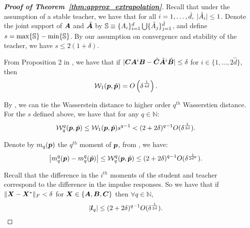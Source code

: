 \begin{proof}[\textbf{Proof of Theorem~\ref{thm:approx_extrapolation}}]
Recall that under the assumption of a stable teacher, we have that for all $i=1,\dots,\hat{d},\; |\hat{{A}}_i|\le 1$. Denote the joint support of ${\bm{A}}$ and $\hat{{\bm{A}}}$ by ${\mathbb{S}}\equiv \{{A}_i\}_{i=1}^{d}\bigcup \{\hat{{A}}_j\}_{j=1}^{\hat{d}}$, and define $s=\max \{{\mathbb{S}}\} - \min \{{\mathbb{S}}\}$. By our assumption on convergence and stability of the teacher, we have $s\le 2(1+\delta)$.

From Proposition 2 in \cite{wu2020optimal}, we have that if $|{\bm{C}}{\bm{A}}^i{\bm{B}}-\hat{{\bm{C}}}\hat{{\bm{A}}}^i\hat{{\bm{B}}}|\le \delta$ for $i\in\lbrace 1,\dots,2\hat{d}\rbrace$, then
\begin{equation}
    \mathcal{W}_1({\bm{p}},\hat{{\bm{p}}})=O\left(\delta^{\frac{1}{4\hat{d}}}\right).
\end{equation}

By \cite[Section 2.3]{panaretos2019statistical}, we can tie the Wasserstein distance to higher order $q^{th}$ Wasserstien distance. For the $s$ defined above, we have that for any $q \in \mathbb{N}$:
\begin{equation}
    \mathcal{W}_q^q({\bm{p}}, \hat{{\bm{p}}}) \leq \mathcal{W}_1({\bm{p}}, \hat{{\bm{p}}}) s^{q-1} < (2+2\delta)^{q-1} O(\delta^{\frac{1}{2\hat{d}}}).
\end{equation}


Denote by $m_q({\bm{p}})$ the $q^{th}$ moment of ${\bm{p}}$, from \cite[Equation 1]{biswas2021bounding}, we have:
\begin{equation}
    \left| m_q^q({\bm{p}}) - m_q^q(\hat{{\bm{p}}}) \right| \leq \mathcal{W}_q^q({\bm{p}}, \hat{{\bm{p}}}) \leq (2+2\delta)^{q-1} O(\delta^{\frac{1}{2d^*}}).
\end{equation}

Recall that the difference in the $i^{th}$ moments of the student and teacher correspond to the difference in the impulse responses. So we have that if $\|{\bm{X}}-{\bm{X}}^*\|_F<\delta$ for ${\bm{X}}\in\{{\bm{A}}, {\bm{B}}, {\bm{C}}\}$ then $\forall q\in\mathbb{N}$,
\begin{equation}\label{eq:apdx:final_inequality}
    \left| {\bm{l}}_q \right|  \leq (2+2\delta)^{q-1} O(\delta^{\frac{1}{2\hat{d}}}).
\end{equation}




\end{proof}
